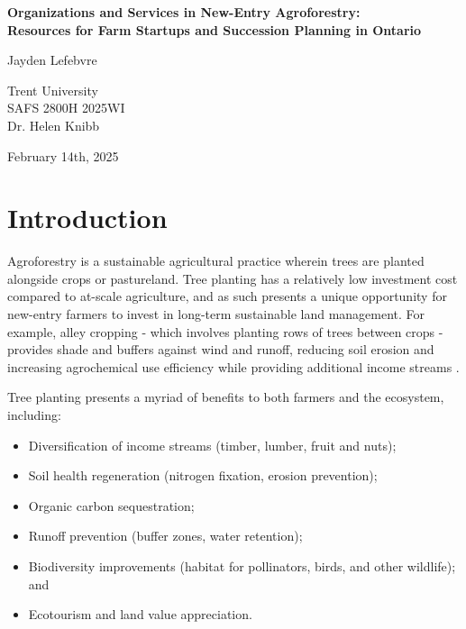 \documentclass{report}
\begin{document}
\begin{titlepage}
    \begin{center}
        \vspace*{1.2cm}

        \textbf{Organizations and Services in New-Entry Agroforestry:\\Resources for Farm Startups and Succession Planning in Ontario}

        \vspace{2cm}

        Jayden Lefebvre\\

        \vspace{5cm}
        
        Trent University\\
        SAFS 2800H 2025WI\\
        Dr. Helen Knibb\\

        \vfill

        February 14th, 2025
        
    \end{center}
\end{titlepage}

\clearpage


\section{Introduction}


\hspace{24pt}Agroforestry is a sustainable agricultural practice wherein trees are planted alongside crops or pastureland. Tree planting has a relatively low investment cost compared to at-scale agriculture, and as such presents a unique opportunity for new-entry farmers to invest in long-term sustainable land management. For example, alley cropping - which involves planting rows of trees between crops - provides shade and buffers against wind and runoff, reducing soil erosion and increasing agrochemical use efficiency while providing additional income streams \parencite{benefits}.

Tree planting presents a myriad of benefits to both farmers and the ecosystem, including:
\begin{itemize}
    \item Diversification of income streams (timber, lumber, fruit and nuts);
    \item Soil health regeneration (nitrogen fixation, erosion prevention);
    \item Organic carbon sequestration;
    \item Runoff prevention (buffer zones, water retention);
    \item Biodiversity improvements (habitat for pollinators, birds, and other wildlife); and
    \item Ecotourism and land value appreciation.
\end{itemize}
\end{document}
